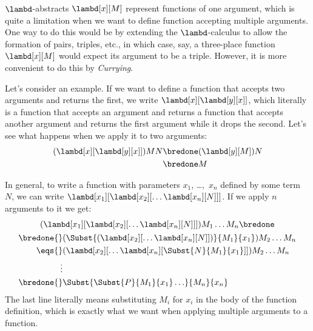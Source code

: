 \documentclass[../../../include/open-logic-section]{subfiles}
\begin{document}

$\lambd$-abstracts $\lambd[x][M]$ represent functions of one argument,
which is quite a limitation when we want to define function accepting
multiple arguments.  One way to do this would be by extending the
$\lambd$-calculus to allow the formation of pairs, triples, etc., in
which case, say, a three-place function $\lambd[x][M]$ would expect
its argument to be a triple.  However, it is more convenient to do
this by \emph{Currying}.

Let's consider an example. If we want to define a function that
accepts two arguments and returns the first, we write
$\lambd[x][\lambd[y][x]]$, which literally is a function that accepts
an argument and returns a function that accepts another argument and
returns the first argument while it drops the second. Let's see what
happens when we apply it to two arguments:
\begin{align*}
  (\lambd[x][\lambd[y][x]])MN 
  \bredone & (\lambd[y][M])N \\
  \bredone & M
\end{align*}

In general, to write a function with parameters $x_1$, \dots,~$x_n$
defined by some term~$N$, we can write
$\lambd[x_1][\lambd[x_2][\ldots\lambd[x_n][N]]]$. If we apply $n$ arguments
to it we get:
\begin{multline*}
  (\lambd[x_1][\lambd[x_2][\ldots\lambd[x_n][N]]]) M_1 \dots M_n \bredone\\
  \begin{aligned}
  \bredone {} & (\Subst{(\lambd[x_2][\ldots\lambd[x_n][N]])}{M_1}{x_1}) M_2
  \dots M_n\\
   \eqs {} & (\lambd[x_2][\ldots\lambd[x_n][\Subst{N}{M_1}{x_1}]]) M_2
            \dots M_n \\
  \vdots & \\
  \bredone {} &\Subst{\Subst{P}{M_1}{x_1}\ldots}{M_n}{x_n}
  \end{aligned}
\end{multline*}
The last line literally means substituting $M_i$ for $x_i$ in the body
of the function definition, which is exactly what we want when
applying multiple arguments to a function.
\end{document}

